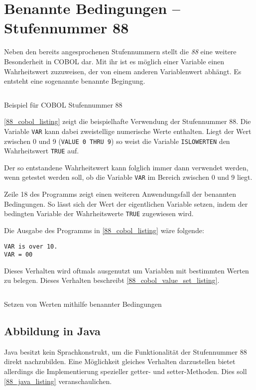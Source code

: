 \section{Benannte Bedingungen -- Stufennummer 88}
Neben den bereits angesprochenen Stufennummern stellt die \textit{88} eine weitere Besonderheit in COBOL dar. Mit ihr ist es möglich einer Variable einen Wahrheitswert zuzuweisen, der von einem anderen Variablenwert abhängt. Es entsteht eine sogenannte benannte Begingung.

\begin{listing}[H]
  \inputminted{cobol}{Code/88_section.cbl}
  \caption{Beispiel für COBOL Stufennummer 88}
  \label{88_cobol_listing}
\end{listing} 

\autoref{88_cobol_listing} zeigt die beispielhafte Verwendung der Stufennummer 88. Die Variable \texttt{VAR} kann dabei zweistellige numerische Werte enthalten. Liegt der Wert zwischen 0 und 9 (\texttt{VALUE 0 THRU 9}) so weist die Variable \texttt{ISLOWERTEN} den Wahrheitswert \texttt{TRUE} auf.

Der so entstandene Wahrheitswert kann folglich immer dann verwendet werden, wenn getestet werden soll, ob die Variable \texttt{VAR} im Bereich zwischen 0 und 9 liegt.

Zeile 18 des Programms zeigt einen weiteren Anwendungsfall der benannten Bedingungen. So lässt sich der Wert der eigentlichen Variable setzen, indem der bedingten Variable der Wahrheitswerte \texttt{TRUE} zugewiesen wird.

Die Ausgabe des Programms in \autoref{88_cobol_listing} wäre folgende:
\begin{verbatim}
VAR is over 10.
VAR = 00
\end{verbatim}

Dieses Verhalten wird oftmals ausgenutzt um Variablen mit bestimmten Werten zu belegen. Dieses Verhalten beschreibt \autoref{88_cobol_value_set_listing}.

\begin{listing}[H]
  \inputminted{cobol}{Code/88_section_value_set.cbl}
  \caption{Setzen von Werten mithilfe benannter Bedingungen}
  \label{88_cobol_value_set_listing}
\end{listing} 

\subsection*{Abbildung in Java}
Java besitzt kein Sprachkonstrukt, um die Funktionalität der Stufennummer 88 direkt nachzubilden. Eine Möglichkeit gleiches Verhalten darzustellen bietet allerdings die Implementierung spezieller getter- und setter-Methoden. Dies soll \autoref{88_java_listing} veranschaulichen.

